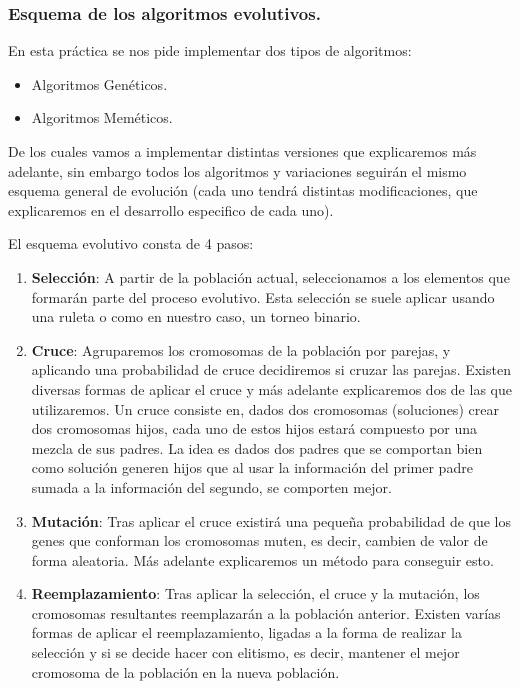 \documentclass[12pt, spanish]{article}
\begin{document}
\subsubsection{Esquema de los algoritmos evolutivos.}

En esta práctica se nos pide implementar dos tipos de algoritmos:

\begin{itemize}
	\item {Algoritmos Genéticos.}
	\item {Algoritmos Meméticos.}
\end{itemize}

De los cuales vamos a implementar distintas versiones que explicaremos más adelante, sin embargo todos los algoritmos y variaciones seguirán el mismo esquema general de evolución (cada uno tendrá distintas modificaciones, que explicaremos en el desarrollo especifico de cada uno).

\newpage

El esquema evolutivo consta de 4 pasos:

\begin{enumerate}
	\item \textbf{Selección}: A partir de la población actual, seleccionamos a los elementos que formarán parte del proceso evolutivo. Esta selección se suele aplicar usando una ruleta o como en nuestro caso, un torneo binario.
	\item \textbf{Cruce}: Agruparemos los cromosomas de la población por parejas, y aplicando una probabilidad de cruce decidiremos si cruzar las parejas. Existen diversas formas de aplicar el cruce y más adelante explicaremos dos de las que utilizaremos. Un cruce consiste en, dados dos cromosomas (soluciones) crear dos cromosomas hijos, cada uno de estos hijos estará compuesto por una mezcla de sus padres. La idea es dados dos padres que se comportan bien como solución generen hijos que al usar la información del primer padre sumada a la información del segundo, se comporten mejor.
	\item \textbf{Mutación}: Tras aplicar el cruce existirá una pequeña probabilidad de que los genes que conforman los cromosomas muten, es decir, cambien de valor de forma aleatoria. Más adelante explicaremos un método para conseguir esto.
	\item \textbf{Reemplazamiento}: Tras aplicar la selección, el cruce y la mutación, los cromosomas resultantes reemplazarán a la población anterior. Existen varías formas de aplicar el reemplazamiento, ligadas a la forma de realizar la selección y si se decide hacer con elitismo, es decir, mantener el mejor cromosoma de la población en la nueva población.
\end{enumerate}
\end{document}
